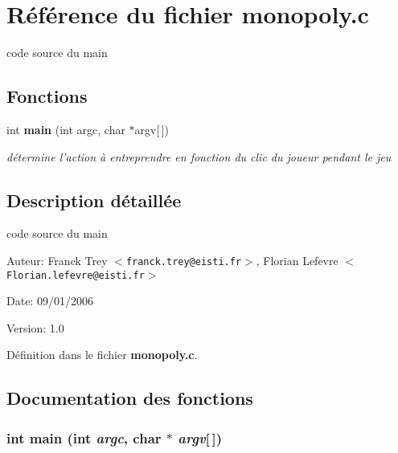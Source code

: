 \section{R\'{e}f\'{e}rence du fichier monopoly.c}
\label{monopoly_8c}
code source du main 

\subsection*{Fonctions}
\begin{CompactItemize}
\item 
int {\bf main} (int argc, char $\ast$argv[$\,$])
\begin{CompactList}\small\item\em d\'{e}termine l'action \`{a} entreprendre en fonction du clic du joueur pendant le jeu \item\end{CompactList}\end{CompactItemize}


\subsection{Description d\'{e}taill\'{e}e}
code source du main 

\begin{Desc}
\item[Auteur:]Franck Trey $<${\tt franck.trey@eisti.fr}$>$, Florian Lefevre $<${\tt Florian.lefevre@eisti.fr}$>$ \end{Desc}
\begin{Desc}
\item[Date:]09/01/2006 \end{Desc}
\begin{Desc}
\item[Version:]1.0 \end{Desc}


D\'{e}finition dans le fichier {\bf monopoly.c}.

\subsection{Documentation des fonctions}
\subsubsection{\setlength{\rightskip}{0pt plus 5cm}int main (int {\em argc}, char $\ast$ {\em argv}[$\,$])}\label{monopoly_8c_0ddf1224851353fc92bfbff6f499fa97}



